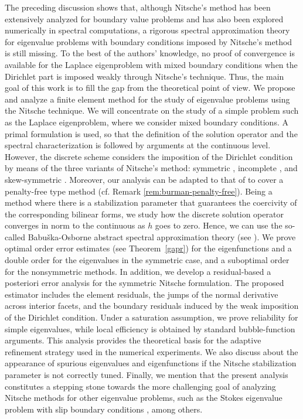 \documentclass[onefignum,onetabnum,final]{siamart250211}
\numberwithin{equation}{section}
\newcommand\0{\boldsymbol{0}}
\begin{document}
	    The preceding discussion shows that, although Nitsche's method has been extensively analyzed for boundary value problems and has also been explored numerically in spectral computations, a rigorous spectral approximation theory for eigenvalue problems with boundary conditions imposed by Nitsche's method is still missing. To the best of the authors' knowledge, no proof of convergence is available for the Laplace eigenproblem with mixed boundary conditions when the Dirichlet part is imposed weakly through Nitsche's technique. Thus, the main goal of this work is to fill the gap from the theoretical point of view. We propose and analyze a finite element method for the study of eigenvalue problems using the Nitsche technique. We will concentrate on the study of a simple problem such as the Laplace eigenproblem, where we consider mixed boundary conditions. A primal formulation is used, so that the definition of the solution operator and the spectral characterization is followed by arguments at the continuous level. However, the discrete scheme considers the imposition of the Dirichlet condition by means of the three variants of Nitsche's method: symmetric \cite{burman2023augmented}, incomplete \cite[Section 37.1]{ern2021finite}, and skew-symmetric \cite{freund1995weakly,burman2012penalty}. {Moreover, our analysis can be adapted to that of \cite{burman2012penalty} to cover a penalty-free type method (cf. Remark \ref{rem:burman-penalty-free})}. Being a method where there is a stabilization parameter that guarantees the coercivity of the corresponding bilinear forms, we study how the discrete solution operator converges in norm to the continuous as $h$ goes to zero. Hence, we can use the so-called Babu\v ska-Osborne abstract spectral approximation theory (see \cite{BO}).
	We prove optimal order error estimates (see Theorem~\ref{gapr}) for the eigenfunctions and
	a double order for the eigenvalues in the symmetric case, and a suboptimal
	order for the nonsymmetric methods. In addition, we develop a residual-based a posteriori error analysis for the symmetric Nitsche formulation. The proposed estimator includes the element residuals, the jumps of the normal derivative across interior facets, and the boundary residuals induced by the weak imposition of the Dirichlet condition. Under a saturation assumption, we prove reliability for simple eigenvalues, while local efficiency is obtained by standard bubble-function arguments. This analysis provides the theoretical basis for the adaptive refinement strategy used in the numerical experiments. We also discuss about the appearance of spurious eigenvalues	and eigenfunctions if the Nitsche stabilization parameter is not correctly tuned.
	Finally, we mention that the present analysis constitutes
	a stepping stone towards the more challenging goal of analyzing Nitsche methods
	for other eigenvalue problems, such as the Stokes eigenvalue problem with slip boundary conditions \cite{berselli20253d,falocchi2022remarks}, among others.
	
\end{document}
